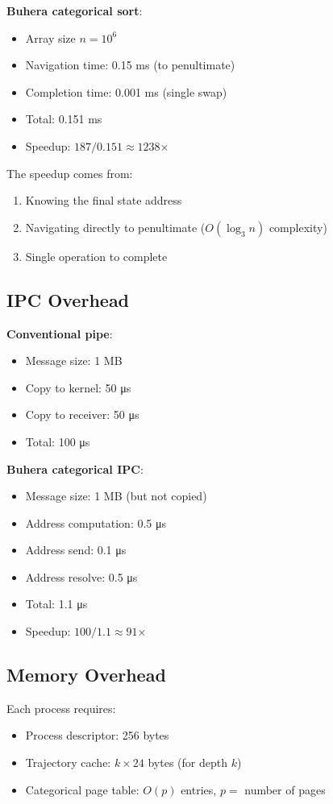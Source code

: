 \documentclass[twocolumn,10pt]{article}
\theoremstyle{definition}
\theoremstyle{remark}
\begin{document}
\textbf{Buhera categorical sort}:
\begin{itemize}
    \item Array size $n = 10^6$
    \item Navigation time: 0.15 ms (to penultimate)
    \item Completion time: 0.001 ms (single swap)
    \item Total: 0.151 ms
    \item Speedup: $187 / 0.151 \approx 1238$×
\end{itemize}

The speedup comes from:
\begin{enumerate}
    \item Knowing the final state address
    \item Navigating directly to penultimate ($O(\log_3 n)$ complexity)
    \item Single operation to complete
\end{enumerate}

\subsection{IPC Overhead}

\textbf{Conventional pipe}:
\begin{itemize}
    \item Message size: 1 MB
    \item Copy to kernel: 50 μs
    \item Copy to receiver: 50 μs
    \item Total: 100 μs
\end{itemize}

\textbf{Buhera categorical IPC}:
\begin{itemize}
    \item Message size: 1 MB (but not copied)
    \item Address computation: 0.5 μs
    \item Address send: 0.1 μs
    \item Address resolve: 0.5 μs
    \item Total: 1.1 μs
    \item Speedup: $100 / 1.1 \approx 91$×
\end{itemize}

\subsection{Memory Overhead}

Each process requires:
\begin{itemize}
    \item Process descriptor: 256 bytes
    \item Trajectory cache: $k \times 24$ bytes (for depth $k$)
    \item Categorical page table: $O(p)$ entries, $p =$ number of pages
\end{itemize}
\end{document}
